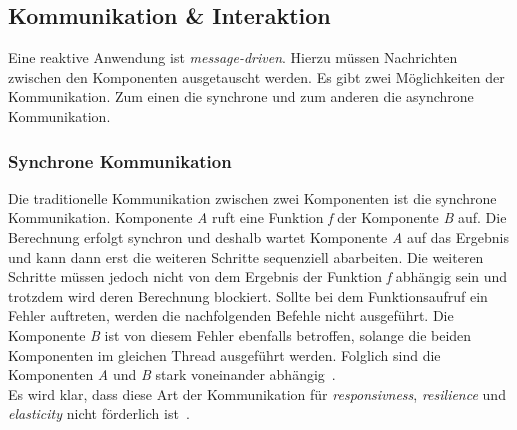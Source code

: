 \pagebreak

\subsection{Kommunikation \& Interaktion}\label{subsec:communication}
Eine reaktive Anwendung ist \textit{message-driven}. Hierzu müssen Nachrichten zwischen den Komponenten ausgetauscht werden. Es gibt zwei Möglichkeiten der Kommunikation. Zum einen die synchrone und zum anderen die asynchrone Kommunikation.

\subsubsection{Synchrone Kommunikation}
Die traditionelle Kommunikation zwischen zwei Komponenten ist die synchrone Kommunikation. Komponente \textit{A} ruft eine Funktion \textit{f} der Komponente \textit{B} auf. Die Berechnung erfolgt synchron und deshalb wartet Komponente \textit{A} auf das Ergebnis und kann dann erst die weiteren Schritte sequenziell abarbeiten. Die weiteren Schritte müssen jedoch nicht von dem Ergebnis der Funktion \textit{f} abhängig sein und trotzdem wird deren Berechnung blockiert. Sollte bei dem Funktionsaufruf ein Fehler auftreten, werden die nachfolgenden Befehle nicht ausgeführt. Die Komponente \textit{B} ist von diesem Fehler ebenfalls betroffen, solange die beiden Komponenten im gleichen Thread ausgeführt werden. Folglich sind die Komponenten \textit{A} und \textit{B} stark voneinander abhängig~\cite[S.~22]{kuhn_reactive_2015}.\\
Es wird klar, dass diese Art der Kommunikation für \textit{responsivness}, \textit{resilience} und \textit{elasticity} nicht förderlich ist~\cite[S.~46]{kuhn_reactive_2015}.

